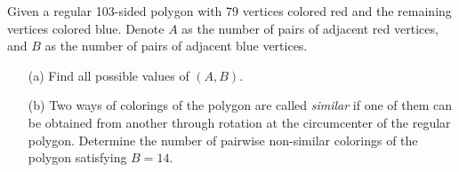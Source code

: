 \documentclass[11pt]{article}
\begin{document}
        \newpage

        \begin{problem}
            Given a regular 103-sided polygon with 79 vertices colored red and the remaining vertices colored blue. Denote \(A\) as the number of pairs of adjacent red vertices, and \(B\) as the number of pairs of adjacent blue vertices.
            \begin{enumerate}
                \item[(a)] Find all possible values of \((A,B)\).
                \item[(b)] Two ways of colorings of the polygon are called \emph{similar} if one of them can be obtained from another through rotation at the circumcenter of the regular polygon. Determine the number of pairwise non-similar colorings of the polygon satisfying \(B = 14\).
            \end{enumerate}
        \end{problem}
        
\end{document}
